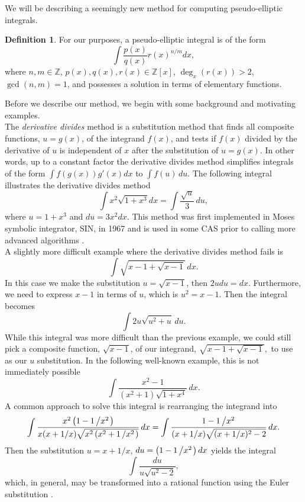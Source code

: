 \documentclass[12pt]{article}
\numberwithin{equation}{section}
\def\todo#1{\textcolor{red}{\textbf{**** TODO -- #1 ****}}}
\theoremstyle{definition}
\newtheorem{definition}{Definition}
\begin{document}


We will be describing a seemingly new method for computing pseudo-elliptic integrals. 
\begin{definition}
For our purposes, a pseudo-elliptic integral is of the form 
$$\int \frac{p(x)}{q(x)}r(x)^{n/m}dx,$$
where $n,m \in \mathbb{Z}$, $p(x),q(x),r(x) \in \mathbb{Z}[x]$, $\deg_x(r(x))>2$, 
$\gcd(n,m)=1$, and possesses a solution in terms of elementary functions. 
\end{definition} 

Before we describe our method, we begin with some background and motivating examples. \\

The \textit{derivative divides} method is a substitution method that finds all composite 
functions, $u=g(x)$, of the integrand $f(x)$, and tests if $f(x)$ divided by the derivative of 
$u$ is independent of $x$ after the substitution of $u=g(x)$. In other words, up to a constant
factor the derivative divides method simplifies integrals of the form $\int f(g(x))g'(x)dx$ to 
$\int f(u) \, du$. The following integral illustrates the derivative divides method 
$$\int x^2\sqrt{1+x^3}dx=\int \frac{\sqrt{u}}{3} \, du,$$ 
where $u=1+x^3$ and $du=3x^2dx$. This method was first implemented in Moses symbolic integrator, 
SIN, in 1967 \cite{Moses1967} and is used in some CAS prior to calling more advanced 
algorithms \cite[pp. 473-474]{Geddes1992}.\\

A slightly more difficult example where the derivative divides method fails is 
$$\int \sqrt{x-1+\sqrt{x-1}} \, dx.$$
In this case we make the substitution $u=\sqrt{x-1}$, then $2udu=dx$. Furthermore, we need to 
express $x-1$ in terms of $u$, which is $u^2=x-1$. Then the integral becomes
$$\int 2u\sqrt{u^2+u}\,du.$$
While this integral was more difficult than the previous example, we could still 
pick a composite function, $\sqrt{x-1}$, of our integrand, $\sqrt{x-1+\sqrt{x-1}},$ to use 
as our $u$ substitution. In the following well-known example, this is not immediately possible
$$\int \frac{x^2-1}{\left(x^2+1\right)\sqrt{1+x^4}} \, dx.$$
A common approach to solve this integral is rearranging the integrand into
$$\int \frac{x^2\left(1-1\left/x^2\right.\right)}{x(x+1/x)\sqrt{x^2\left(x^2+1\left/x^2\right.\right)}} \, dx = 
\int \frac{1-1\left/x^2\right.}{(x+1/x)\sqrt{(x+1/x)^2-2}} \, dx. $$ 
Then the substitution $u=x+1/x$, $du=\left(1-1\left/x^2\right.\right)dx$ yields the integral
$$\int \frac{du}{u\sqrt{u^2-2}},$$
which, in general, may be transformed into a rational function using the Euler substitution \cite{Euler}.\\
\end{document}
